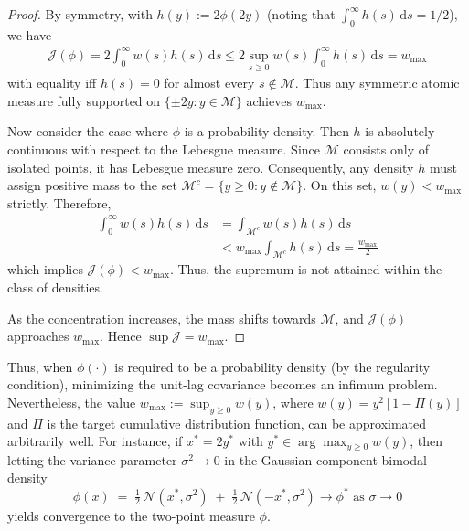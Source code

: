 \documentclass[conference]{IEEEtran}
\newcommand{\df}{\mathrm{d}}
\theoremstyle{definition}
\begin{document}
\begin{proof}
By symmetry, with $h(y):=2\phi(2y)$ (noting that $\int_0^\infty h(s)\,\df s = 1/2$), we have
\begin{align*}
\mathcal{J}(\phi)=2\int_{0}^{\infty} w(s)h(s)\,\df s
\le 2\sup_{s\ge0}w(s)\!\int_{0}^{\infty}h(s)\,\df s=w_{\max}
\end{align*}
with equality iff $h(s)=0$ for almost every $s \notin \mathcal{M}$.
Thus any symmetric atomic measure fully supported on $\{\pm 2y:y\in\mathcal{M}\}$ achieves $w_{\max}$.

Now consider the case where $\phi$ is a probability density. Then $h$ is absolutely continuous with respect to the Lebesgue measure.
Since $\mathcal{M}$ consists only of isolated points, it has Lebesgue measure zero.
Consequently, any density $h$ must assign positive mass to the set $\mathcal{M}^c = \{y \ge 0 : y \notin \mathcal{M}\}$.
On this set, $w(y) < w_{\max}$ strictly.
Therefore,
\begin{align*}
    \int_{0}^{\infty} w(s)h(s)\,\df s& = \int_{\mathcal{M}^c} w(s)h(s)\,\df s\\ &< w_{\max} \int_{\mathcal{M}^c} h(s)\,\df s = \frac{w_{\max}}{2}
\end{align*}
which implies $\mathcal{J}(\phi) < w_{\max}$. Thus, the supremum is not attained within the class of densities.

As the concentration increases, the mass shifts towards $\mathcal{M}$, and $\mathcal{J}(\phi)$ approaches $w_{\max}$.
Hence $\sup\mathcal{J}=w_{\max}$.
\end{proof}

Thus, when $\phi(\cdot)$ is required to be a probability density (by the regularity condition), minimizing the unit-lag covariance becomes an infimum problem. Nevertheless, the value $w_{\max}:=\sup_{y\ge0}w(y)$, where $w(y)=y^2[1-\Pi(y)]$ and $\Pi$ is the target cumulative distribution function, can be approximated arbitrarily well. For instance, if $x^*=2y^*$ with $y^*\in\arg\max_{y\ge0}w(y)$, then letting the variance parameter $\sigma^2\to0$ in the Gaussian-component bimodal density
\[
\phi(x) \;=\; \tfrac{1}{2}\,\mathcal{N}(x^*,\sigma^2) \;+\; \tfrac{1}{2}\,\mathcal{N}(-x^*,\sigma^2)\to\phi^*\text{ as }\sigma\to0
\]
yields convergence to the two-point measure $\phi$.
\end{document}
